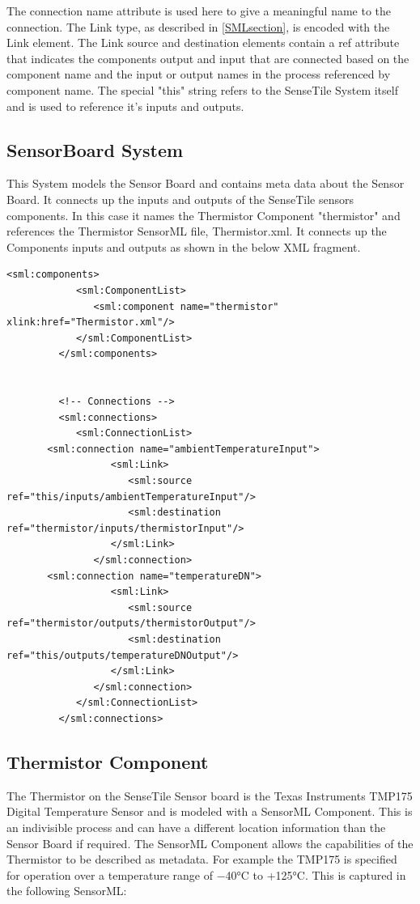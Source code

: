 \documentclass[]{final_report}
\begin{document}
The connection name attribute is used here to give a meaningful name to the connection. The Link type, as described in \ref{SMLsection}, is encoded with the Link element. The Link source and destination elements contain a ref attribute that indicates the components output and input that are connected based on the component name and the input or output names in the process referenced by component name. The special "this" string refers to the SenseTile System itself and is used to reference it's inputs and outputs.
  
\subsection{SensorBoard System}

This System models the Sensor Board and contains meta data about the Sensor Board. It connects up the inputs and outputs of the SenseTile sensors components. In this case it names the Thermistor Component "thermistor" and references the Thermistor SensorML file, Thermistor.xml. It connects up the Components inputs and outputs as shown in the below XML fragment.

\begin{lstlisting}[label=SensorBoardConnectionListing,caption=Sensor Board System Components and Connections List]
         <sml:components>
            <sml:ComponentList>
               <sml:component name="thermistor"  xlink:href="Thermistor.xml"/>
            </sml:ComponentList>			   
         </sml:components>
		 

         <!-- Connections -->
         <sml:connections>
            <sml:ConnectionList>
	   <sml:connection name="ambientTemperatureInput">
                  <sml:Link>
                     <sml:source ref="this/inputs/ambientTemperatureInput"/>
                     <sml:destination ref="thermistor/inputs/thermistorInput"/>
                  </sml:Link>
               </sml:connection>
	   <sml:connection name="temperatureDN">
                  <sml:Link>
                     <sml:source ref="thermistor/outputs/thermistorOutput"/>
                     <sml:destination ref="this/outputs/temperatureDNOutput"/>
                  </sml:Link>
               </sml:connection>
            </sml:ConnectionList>
         </sml:connections>
\end{lstlisting}

\subsection{Thermistor Component}
The Thermistor on the SenseTile Sensor board is the Texas Instruments TMP175 Digital Temperature Sensor and is modeled with a SensorML Component. This is an indivisible process and can have a different location information than the Sensor Board if required. The SensorML Component allows the capabilities of the Thermistor to be described as metadata. For example the TMP175 is  specified for operation over a temperature range of −40°C to +125°C. This is captured in the following SensorML:
\end{document}
